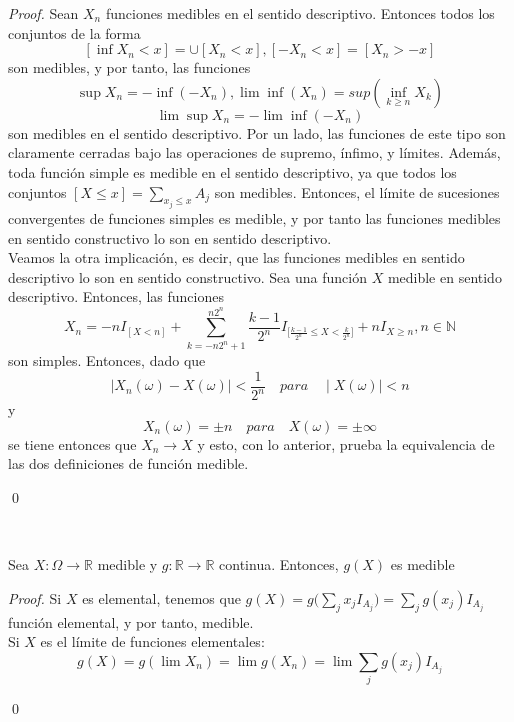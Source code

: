 \begin{proof}
Sean $X_n$ funciones medibles en el sentido descriptivo. Entonces todos los conjuntos de la forma
$$[\inf X_n < x] = \cup [X_n < x], [-X_n < x] = [X_n > -x]$$
son medibles, y por tanto, las funciones
$$\sup X_n = - \inf (-X_n), \lim \inf (X_n) = sup (\inf_{k \geq n} X_k)$$
$$ \lim \sup X_n = - \lim \inf (-X_n)$$
son medibles en el sentido descriptivo. Por un lado, las funciones de este tipo son claramente cerradas bajo las operaciones de supremo, ínfimo, y límites. Además, toda función simple es medible en el sentido descriptivo, ya que todos los conjuntos $[X \leq x] = \displaystyle \sum_{x_j \leq x} A_j$ son medibles. Entonces, el límite de sucesiones convergentes de funciones simples es medible, y por tanto las funciones medibles en sentido constructivo lo son en sentido descriptivo.\\

Veamos la otra implicación, es decir, que las funciones medibles en sentido descriptivo lo son en sentido constructivo. Sea una función $X$ medible en sentido descriptivo. Entonces, las funciones
$$X_n = -nI_{[X < n]} + \sum_{k=-n2^n+1}^{n2^n}\frac{k-1}{2^n}I_{\big[\frac{k-1}{2^n} \leq X < \frac{k}{2^n} \big]} + nI_{X \geq n}, n \in \mathbb{N}$$
son simples. Entonces, dado que
$$\mid X_n(\omega) - X(\omega)\mid < \frac{1}{2^n} \quad para \quad \mid X(\omega)\mid < n$$
y
$$X_n(\omega) = \pm n \quad para \quad  X(\omega) = \pm \infty$$
se tiene entonces que $X_n \to X$ y esto, con lo anterior, prueba la equivalencia de las dos definiciones de función medible.

\qed
\end{proof}


\begin{theorem}
  \ 
  
Sea $X:\Omega \longrightarrow \mathbb{R}$ medible y $g: \mathbb{R} \longrightarrow \mathbb{R}$ continua. Entonces, $ g(X)$ es medible
\end{theorem}

\begin{proof}
Si $X$ es elemental, tenemos que $\displaystyle g(X) = g\Big(\sum_jx_jI_{A_j}\Big)= \sum_j g(x_j)I_{A_j}$ función elemental, y por tanto, medible.\\

Si $X$ es el límite de funciones elementales:
$$g(X) = g(\lim X_n) = \lim g(X_n) = \lim \sum_j g(x_j)I_{A_j}$$

\qed
\end{proof}

